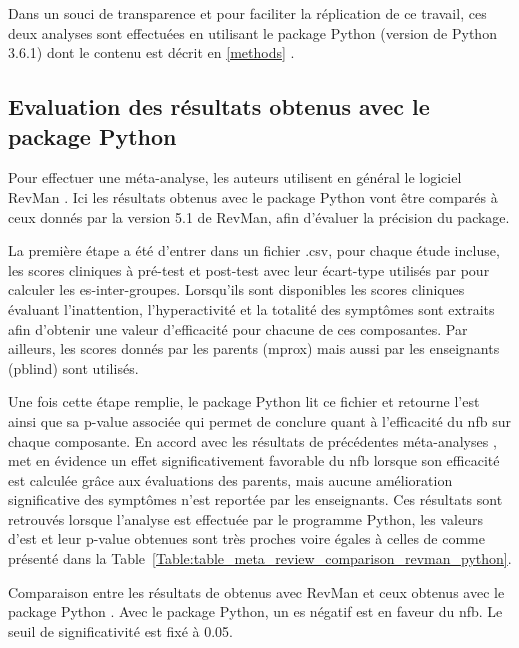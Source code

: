 Dans un souci de transparence et pour faciliter la réplication de ce travail, ces deux analyses sont effectuées en utilisant le package Python 
(version de Python 3.6.1) dont le contenu est décrit en \ref{methods} \citep{Bussalb2019c}. 

\subsection{Evaluation des résultats obtenus avec le package Python}

Pour effectuer une méta-analyse, les auteurs utilisent en général le logiciel RevMan \citep{Revman, Cortese2016, Micoulaud2014}. Ici les résultats 
obtenus avec le package Python vont être comparés à ceux donnés par la version 5.1 de RevMan, afin d'évaluer la précision du package. 

La première étape a été d'entrer dans un fichier .csv, pour chaque étude incluse, les scores cliniques à pré-test et post-test avec leur écart-type utilisés 
par \citet{Cortese2016} pour calculer les \gls{es}-inter-groupes. Lorsqu'ils sont disponibles les scores cliniques évaluant l'inattention, l'hyperactivité 
et la totalité des symptômes sont extraits afin d'obtenir une valeur d'efficacité pour chacune de ces composantes. Par ailleurs, les scores donnés par les
parents (\gls{mprox}) mais aussi par les enseignants (\gls{pblind}) sont utilisés.

Une fois cette étape remplie, le package Python lit ce fichier et retourne l'\gls{est} ainsi que sa p-value associée qui permet de conclure quant à l'efficacité
du \gls{nfb} sur chaque composante. En accord avec les résultats de précédentes méta-analyses \citep{Sonuga-Barke2013, Micoulaud2014}, \citet{Cortese2016}
met en évidence un effet significativement favorable du \gls{nfb} lorsque son efficacité est calculée grâce aux évaluations des parents, mais aucune amélioration 
significative des symptômes n'est reportée par les enseignants. Ces résultats sont retrouvés lorsque l'analyse est effectuée par le programme Python, les valeurs
d'\gls{est} et leur p-value obtenues sont très proches voire égales à celles de \citet{Cortese2016} comme présenté dans la 
Table~\ref{Table:table_meta_review_comparison_revman_python}. 

\begin{table}[h!]
  \centering
  \caption{Comparaison entre les résultats de \citet{Cortese2016} obtenus avec RevMan \citep{Revman} et ceux obtenus avec le package Python \citep{Bussalb2019clinical}.
	Avec le package Python, un \gls{es} négatif est en faveur du \gls{nfb}. Le seuil de significativité est fixé à 0.05.}
  
  \label{Table:table_meta_review_comparison_revman_python}
\end{table}

